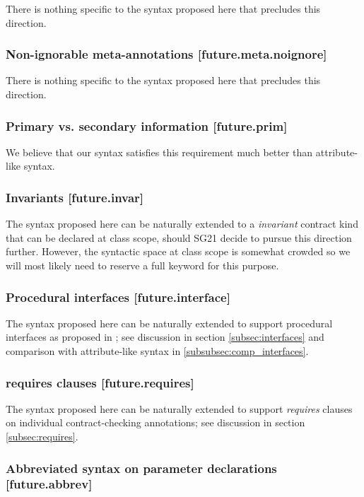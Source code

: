There is nothing specific to the syntax proposed here that precludes this direction.

\subsubsection{Non-ignorable meta-annotations  [future.meta.noignore]}

There is nothing specific to the syntax proposed here that precludes this direction.

\subsubsection{Primary vs. secondary information  [future.prim]}

We believe that our syntax satisfies this requirement much better than attribute-like syntax.

\subsubsection{Invariants  [future.invar]}

The syntax proposed here can be naturally extended to a \emph{invariant} contract kind that can be declared at class scope, should SG21 decide to pursue this direction further. However, the syntactic space at class scope is somewhat crowded so we will most likely need to reserve a full keyword for this purpose.

\subsubsection{Procedural interfaces  [future.interface]}

The syntax proposed here can be naturally extended to support procedural interfaces as proposed in \cite{P0465R0}; see discussion in section \ref{subsec:interfaces} and comparison with attribute-like syntax in \ref{subsubsec:comp_interfaces}.

\subsubsection{requires clauses  [future.requires]}

The syntax proposed here can be naturally extended to support \emph{requires} clauses on individual contract-checking annotations; see discussion in section \ref{subsec:requires}.

\subsubsection{Abbreviated syntax on parameter declarations  [future.abbrev]}

